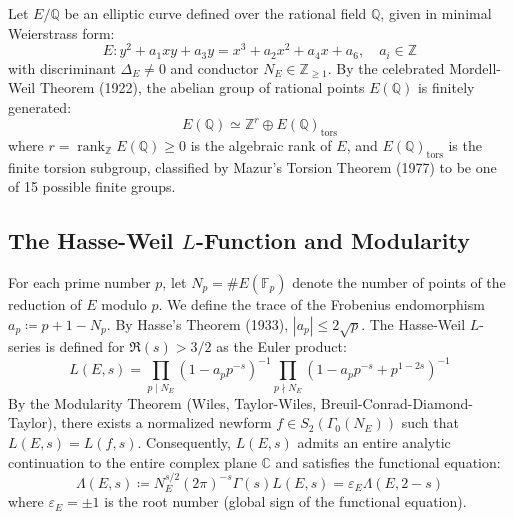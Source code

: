 \documentclass[11pt,a4paper]{article}
\theoremstyle{definition}
\begin{document}
Let $E/\mathbb{Q}$ be an elliptic curve defined over the rational field $\mathbb{Q}$, given in minimal Weierstrass form:
\begin{equation}
E : y^2 + a_1 xy + a_3 y = x^3 + a_2 x^2 + a_4 x + a_6, \quad a_i \in \mathbb{Z}
\end{equation}
with discriminant $\Delta_E \neq 0$ and conductor $N_E \in \mathbb{Z}_{\ge 1}$. By the celebrated Mordell-Weil Theorem (1922), the abelian group of rational points $E(\mathbb{Q})$ is finitely generated:
\begin{equation}
E(\mathbb{Q}) \simeq \mathbb{Z}^r \oplus E(\mathbb{Q})_{\mathrm{tors}}
\end{equation}
where $r = \operatorname{rank}_{\mathbb{Z}} E(\mathbb{Q}) \ge 0$ is the algebraic rank of $E$, and $E(\mathbb{Q})_{\mathrm{tors}}$ is the finite torsion subgroup, classified by Mazur's Torsion Theorem (1977) to be one of 15 possible finite groups.

\subsection{\texorpdfstring{The Hasse-Weil $L$-Function and Modularity}{The Hasse-Weil L-Function and Modularity}}
For each prime number $p$, let $N_p = \#E(\mathbb{F}_p)$ denote the number of points of the reduction of $E$ modulo $p$. We define the trace of the Frobenius endomorphism $a_p \coloneqq p + 1 - N_p$. By Hasse's Theorem (1933), $|a_p| \le 2\sqrt{p}$. The Hasse-Weil $L$-series is defined for $\Re(s) > 3/2$ as the Euler product:
\begin{equation}
L(E, s) = \prod_{p \mid N_E} \left(1 - a_p p^{-s}\right)^{-1} \prod_{p \nmid N_E} \left(1 - a_p p^{-s} + p^{1-2s}\right)^{-1}
\end{equation}
By the Modularity Theorem (Wiles, Taylor-Wiles, Breuil-Conrad-Diamond-Taylor), there exists a normalized newform $f \in S_2(\Gamma_0(N_E))$ such that $L(E,s) = L(f,s)$. Consequently, $L(E,s)$ admits an entire analytic continuation to the entire complex plane $\mathbb{C}$ and satisfies the functional equation:
\begin{equation}
\Lambda(E, s) \coloneqq N_E^{s/2} (2\pi)^{-s} \Gamma(s) L(E, s) = \varepsilon_E \Lambda(E, 2 - s)
\end{equation}
where $\varepsilon_E = \pm 1$ is the root number (global sign of the functional equation).
\end{document}
